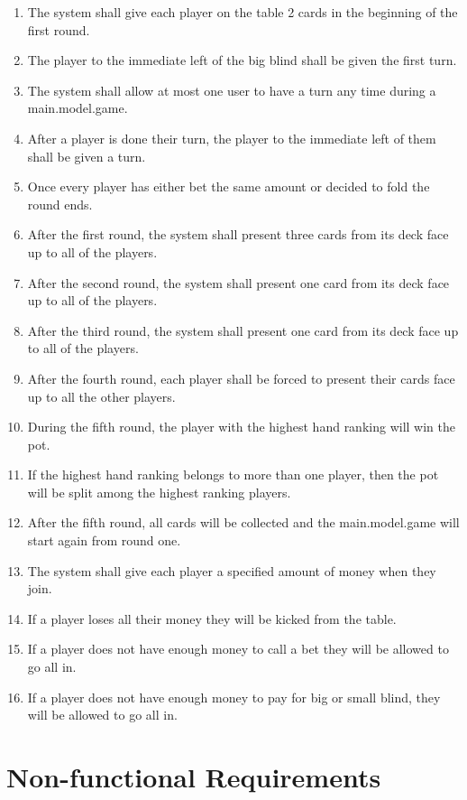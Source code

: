 \documentclass[12pt, titlepage]{article}
\begin{document}
\begin{enumerate}[label=FR\arabic*.]
        \item The system shall give each player on the table 2 cards in the beginning of the first round.
        \item The player to the immediate left of the big blind shall be given the first turn.
        \item The system shall allow at most one user to have a turn any time during a main.model.game.
        \item After a player is done their turn, the player to the immediate left of them shall be given a turn.
        \item Once every player has either bet the same amount or decided to fold the round ends.
        \item After the first round, the system shall present three cards from its deck face up to all of the players.
        \item After the second round, the system shall present one card from its deck face up to all of the players.
        \item After the third round, the system shall present one card from its deck face up to all of the players.
        \item After the fourth round, each player shall be forced to present their cards face up to all the other players.
        \item During the fifth round, the player with the highest hand ranking will win the pot.
        \item If the highest hand ranking belongs to more than one player, then the pot will be split among the highest ranking players.
        \item After the fifth round, all cards will be collected and the main.model.game will start again from round one.
        \item The system shall give each player a specified amount of money when they join.
        \item If a player loses all their money they will be kicked from the table.
        \item If a player does not have enough money to call a bet they will be allowed to go all in.
        \item If a player does not have enough money to pay for big or small blind, they will be allowed to go all in.
        
    \end{enumerate}
\section{Non-functional Requirements}
\end{document}
